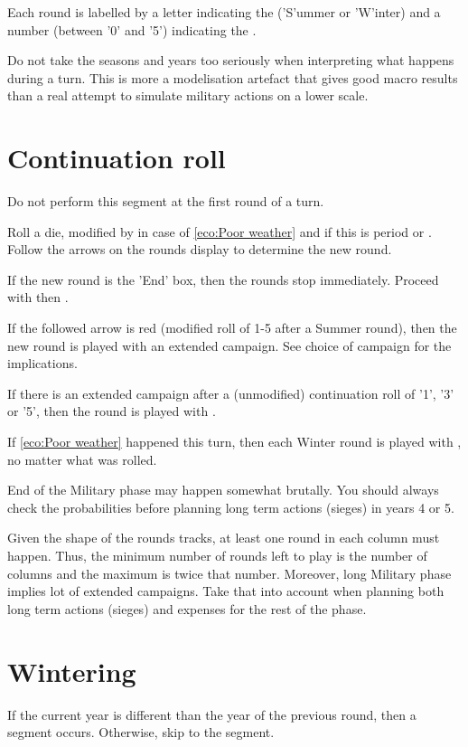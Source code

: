 Each round is labelled by a letter indicating the  ('S'ummer or
'W'inter) and a number (between '0' and '5') indicating the .

\begin{designnote}
  Do not take the seasons and years too seriously when interpreting what
  happens during a turn. This is more a modelisation artefact that gives good
  macro results than a real attempt to simulate military actions on a lower
  scale.
\end{designnote}

\section{Continuation roll}
Do not perform this segment at the first round of a turn.

Roll a die, modified by  in case of \ref{eco:Poor weather} and
 if this is period  or . Follow the arrows on
the rounds display to determine the new round.

If the new round is the 'End' box, then the rounds stop immediately. Proceed
with  then .

If the followed arrow is red (modified roll of 1-5 after a Summer round), then
the new round is played with an extended campaign. See choice of campaign for
the implications.

If there is an extended campaign after a (unmodified) continuation roll of
'1', '3' or '5', then the round is played with .

If \ref{eco:Poor weather} happened this turn, then each Winter round is played
with , no matter what was rolled.

\begin{playtip}
  End of the Military phase may happen somewhat brutally. You should always
  check the probabilities before planning long term actions (sieges) in years
  4 or 5.

  Given the shape of the rounds tracks, at least one round in each column must
  happen. Thus, the minimum number of rounds left to play is the number of
  columns and the maximum is twice that number. Moreover, long Military phase
  implies lot of extended campaigns. Take that into account when planning both
  long term actions (sieges) and expenses for the rest of the phase.
\end{playtip}

\section{Wintering}
If the current year is different than the year of the previous round, then a
 segment occurs. Otherwise, skip to the 
segment.

